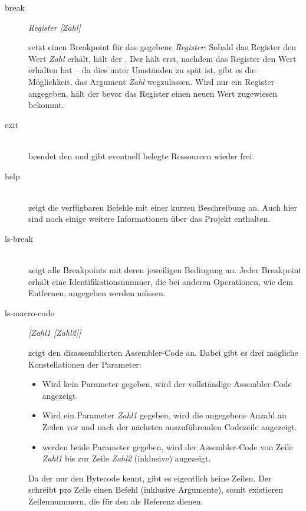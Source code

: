 \begin{description}
\item[break] \emph{Register [Zahl]}

  setzt einen Breakpoint für das gegebene \emph{Register}: Sobald das Register den Wert \emph{Zahl} erhält, hält der \md{}. Der \md{} hält erst, nachdem das Register den Wert erhalten hat -- da dies unter Umständen zu spät ist, gibt es die Möglichkeit, das Argument \emph{Zahl} wegzulassen. Wird nur ein Register angegeben, hält der \md{} bevor das Register einen neuen Wert zugewiesen bekommt.

\item[exit] \hspace*{\fill}\\

  beendet den \md{} und gibt eventuell belegte Ressourcen wieder frei.

\item[help] \hspace*{\fill}\\

  zeigt die verfügbaren Befehle mit einer kurzen Beschreibung an. Auch hier sind noch einige weitere Informationen über das Projekt enthalten.

\item[ls-break] \hspace*{\fill}\\

  zeigt alle Breakpoints mit deren jeweiligen Bedingung an. Jeder Breakpoint erhält eine Identifikationsnummer, die bei anderen Operationen, wie dem Entfernen, angegeben werden müssen.

\item[ls-macro-code] \emph{[Zahl1 [Zahl2]]}

  zeigt den disassemblierten Assembler-Code an. Dabei gibt es drei mögliche Konstellationen der Parameter:
  \begin{itemize}
  \item Wird kein Parameter gegeben, wird der vollständige Assembler-Code angezeigt.
  \item Wird ein Parameter \emph{Zahl1} gegeben, wird die angegebene Anzahl an Zeilen vor und nach der nächsten auszuführenden Codezeile angezeigt.
  \item werden beide Parameter gegeben, wird der Assembler-Code von Zeile \emph{Zahl1} bis zur Zeile \emph{Zahl2} (inklusive) angezeigt.
  \end{itemize}

  Da der \md{} nur den Bytecode kennt, gibt es eigentlich keine Zeilen. Der \md{} schreibt pro Zeile einen Befehl (inklusive Argumente), somit existieren Zeilennummern, die für den \md{} als Referenz dienen.


\end{description}
